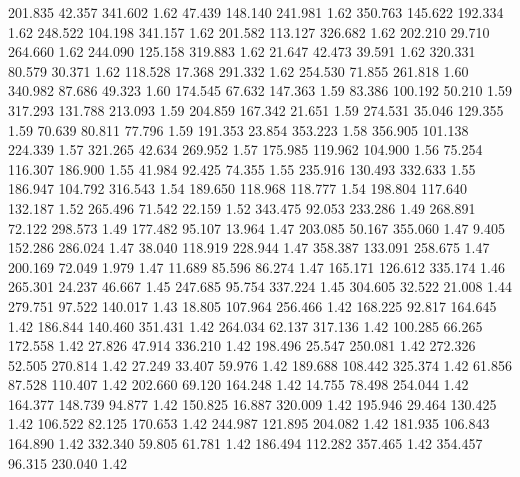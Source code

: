  201.835   42.357  341.602         1.62
  47.439  148.140  241.981         1.62
 350.763  145.622  192.334         1.62
 248.522  104.198  341.157         1.62
 201.582  113.127  326.682         1.62
 202.210   29.710  264.660         1.62
 244.090  125.158  319.883         1.62
  21.647   42.473   39.591         1.62
 320.331   80.579   30.371         1.62
 118.528   17.368  291.332         1.62
 254.530   71.855  261.818         1.60
 340.982   87.686   49.323         1.60
 174.545   67.632  147.363         1.59
  83.386  100.192   50.210         1.59
 317.293  131.788  213.093         1.59
 204.859  167.342   21.651         1.59
 274.531   35.046  129.355         1.59
  70.639   80.811   77.796         1.59
 191.353   23.854  353.223         1.58
 356.905  101.138  224.339         1.57
 321.265   42.634  269.952         1.57
 175.985  119.962  104.900         1.56
  75.254  116.307  186.900         1.55
  41.984   92.425   74.355         1.55
 235.916  130.493  332.633         1.55
 186.947  104.792  316.543         1.54
 189.650  118.968  118.777         1.54
 198.804  117.640  132.187         1.52
 265.496   71.542   22.159         1.52
 343.475   92.053  233.286         1.49
 268.891   72.122  298.573         1.49
 177.482   95.107   13.964         1.47
 203.085   50.167  355.060         1.47
   9.405  152.286  286.024         1.47
  38.040  118.919  228.944         1.47
 358.387  133.091  258.675         1.47
 200.169   72.049    1.979         1.47
  11.689   85.596   86.274         1.47
 165.171  126.612  335.174         1.46
 265.301   24.237   46.667         1.45
 247.685   95.754  337.224         1.45
 304.605   32.522   21.008         1.44
 279.751   97.522  140.017         1.43
  18.805  107.964  256.466         1.42
 168.225   92.817  164.645         1.42
 186.844  140.460  351.431         1.42
 264.034   62.137  317.136         1.42
 100.285   66.265  172.558         1.42
  27.826   47.914  336.210         1.42
 198.496   25.547  250.081         1.42
 272.326   52.505  270.814         1.42
  27.249   33.407   59.976         1.42
 189.688  108.442  325.374         1.42
  61.856   87.528  110.407         1.42
 202.660   69.120  164.248         1.42
  14.755   78.498  254.044         1.42
 164.377  148.739   94.877         1.42
 150.825   16.887  320.009         1.42
 195.946   29.464  130.425         1.42
 106.522   82.125  170.653         1.42
 244.987  121.895  204.082         1.42
 181.935  106.843  164.890         1.42
 332.340   59.805   61.781         1.42
 186.494  112.282  357.465         1.42
 354.457   96.315  230.040         1.42
